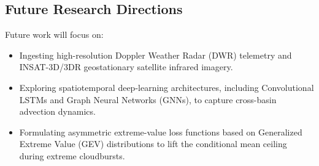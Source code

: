 \documentclass[12pt]{article}
\begin{document}
\subsection{Future Research Directions}
Future work will focus on:
\begin{itemize}
    \item Ingesting high-resolution Doppler Weather Radar (DWR) telemetry and INSAT-3D/3DR geostationary satellite infrared imagery.
    \item Exploring spatiotemporal deep-learning architectures, including Convolutional LSTMs and Graph Neural Networks (GNNs), to capture cross-basin advection dynamics.
    \item Formulating asymmetric extreme-value loss functions based on Generalized Extreme Value (GEV) distributions to lift the conditional mean ceiling during extreme cloudbursts.
\end{itemize}

\newpage
{}

\end{document}

